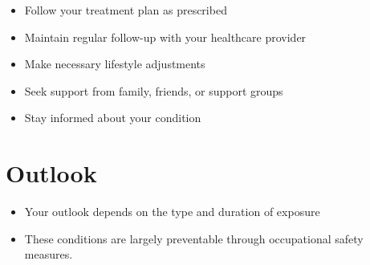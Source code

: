 \begin{itemize}[noitemsep]
  \item Follow your treatment plan as prescribed
  \item Maintain regular follow-up with your healthcare provider
  \item Make necessary lifestyle adjustments
  \item Seek support from family, friends, or support groups
  \item Stay informed about your condition
\end{itemize}
\section{Outlook}
\begin{itemize}[noitemsep]
  \item Your outlook depends on the type and duration of exposure
  \item These conditions are largely preventable through occupational safety measures.
\end{itemize}

